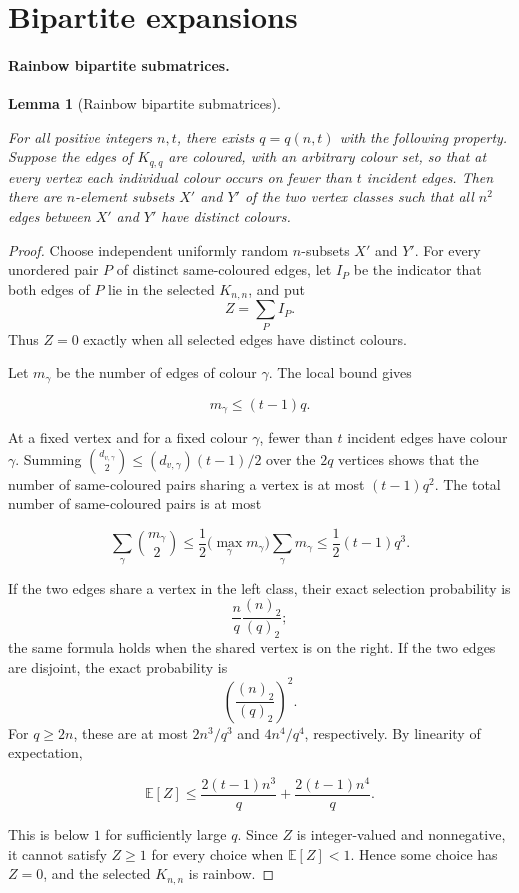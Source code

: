 \documentclass[a4paper,11pt,reqno]{amsart}
\theoremstyle{plain}
\newtheorem{lemma}[theorem]{Lemma}
\theoremstyle{definition}
\theoremstyle{remark}
\begin{document}
\section{Bipartite expansions}\label{private-vertex-expansions-of-bipartite-graphs-are-obligatory}

\paragraph{Rainbow bipartite submatrices.}\label{rainbow-bipartite-submatrices}

\begin{lemma}[Rainbow bipartite submatrices]\label{lemma-3.1-rainbow-bipartite-submatrices}

For all positive integers \(n,t\), there exists \(q=q(n,t)\) with the following property. Suppose the edges of \(K_{q,q}\) are coloured, with an arbitrary colour set, so that at every vertex each individual colour occurs on fewer than \(t\) incident edges. Then there are \(n\)-element subsets \(X'\) and \(Y'\) of the two vertex classes such that all \(n^2\) edges between \(X'\) and \(Y'\) have distinct colours.

\end{lemma}
\begin{proof}
Choose independent uniformly random \(n\)-subsets \(X'\) and \(Y'\). For every unordered pair \(P\) of distinct same-coloured edges, let \(I_P\) be the indicator that both edges of \(P\) lie in the selected \(K_{n,n}\), and put
\[
 Z=\sum_P I_P.
\]
Thus \(Z=0\) exactly when all selected edges have distinct colours.

Let \(m_\gamma\) be the number of edges of colour \(\gamma\). The local bound gives

\[
m_\gamma\le(t-1)q.
\]

At a fixed vertex and for a fixed colour \(\gamma\), fewer than \(t\)
incident edges have colour \(\gamma\). Summing
\(\binom{d_{v,\gamma}}2\le(d_{v,\gamma})(t-1)/2\) over the \(2q\)
vertices shows that the number of same-coloured pairs sharing a vertex is
at most \((t-1)q^2\). The total number of same-coloured pairs is at most

\[
\sum_\gamma\binom{m_\gamma}{2}
\le \frac12\bigl(\max_\gamma m_\gamma\bigr)\sum_\gamma m_\gamma
\le \frac12(t-1)q^3.
\]

If the two edges share a vertex in the left class, their exact selection
probability is
\[
 \frac nq\frac{(n)_2}{(q)_2};
\]
the same formula holds when the shared vertex is on the right. If the two
edges are disjoint, the exact probability is
\[
 \left(\frac{(n)_2}{(q)_2}\right)^2.
\]
For \(q\ge2n\), these are at most \(2n^3/q^3\) and \(4n^4/q^4\),
respectively. By linearity of expectation,

\[
\mathbb{E}\!\left[Z\right]
 \le\frac{2(t-1)n^3}{q}+\frac{2(t-1)n^4}{q}.
\]

This is below \(1\) for sufficiently large \(q\). Since \(Z\) is
integer-valued and nonnegative, it cannot satisfy \(Z\ge1\) for every
choice when \(\mathbb{E}\!\left[Z\right]<1\). Hence some choice has \(Z=0\), and the
selected \(K_{n,n}\) is rainbow.
\end{proof}
\end{document}
